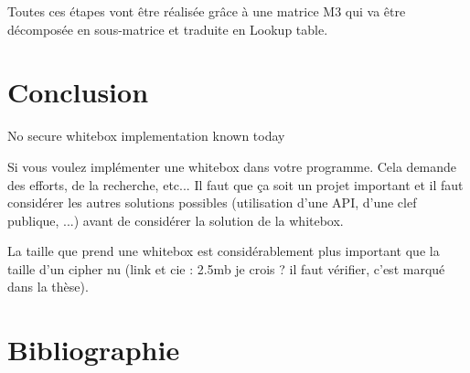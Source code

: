 \documentclass[a4paper,12pt]{article}
\begin{document}
Toutes ces étapes vont être réalisée grâce à une matrice M3 qui va être décomposée en sous-matrice et traduite en Lookup table.

\section{Conclusion}

No secure whitebox implementation known today

Si vous voulez implémenter une whitebox dans votre programme. Cela demande des efforts, de la recherche, etc... Il faut que ça soit un projet important et il faut considérer les autres solutions possibles (utilisation d'une API, d'une clef publique, ...) avant de considérer la solution de la whitebox.

La taille que prend une whitebox est considérablement plus important que la taille d'un cipher nu (link et cie : 2.5mb je crois ? il faut vérifier, c'est marqué dans la thèse).

\newpage

\section{Bibliographie}
\end{document}
